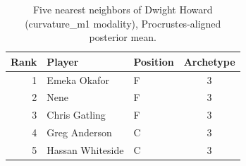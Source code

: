 \begin{table}[htbp]
  \centering\small
  \begin{tabular}{rllc}
    \toprule
    Rank & Player & Position & Archetype \\
    \midrule
    1 & Emeka Okafor & F & 3 \\
    2 & Nene & F & 3 \\
    3 & Chris Gatling & F & 3 \\
    4 & Greg Anderson & C & 3 \\
    5 & Hassan Whiteside & C & 3 \\
    \bottomrule
  \end{tabular}
  \caption{Five nearest neighbors of Dwight Howard (curvature_m1 modality), Procrustes-aligned posterior mean.}
  \label{tab:Dwight_Howard_neighbors_curvature_m1}
\end{table}

